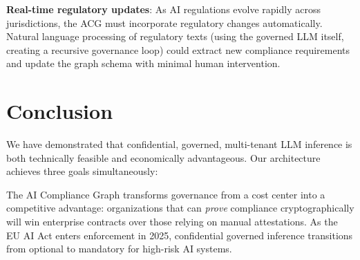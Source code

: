 \documentclass[conference,10pt]{IEEEtran}
\begin{document}
\textbf{Real-time regulatory updates}: As AI regulations evolve rapidly across jurisdictions, the ACG must incorporate regulatory changes automatically. Natural language processing of regulatory texts (using the governed LLM itself, creating a recursive governance loop) could extract new compliance requirements and update the graph schema with minimal human intervention.

\section{Conclusion}
\label{sec:conc}

We have demonstrated that confidential, governed, multi-tenant LLM inference is both technically feasible and economically advantageous. Our architecture achieves three goals simultaneously:

\begin{table}[!htbp]
\caption{Summary of Key Results}
\label{tab:summary}
\centering\scriptsize
{}
\end{table}

The AI Compliance Graph transforms governance from a cost center into a competitive advantage: organizations that can \emph{prove} compliance cryptographically will win enterprise contracts over those relying on manual attestations. As the EU AI Act enters enforcement in 2025, confidential governed inference transitions from optional to mandatory for high-risk AI systems.
\end{document}
